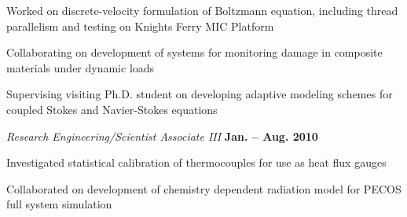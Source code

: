 \documentclass[12pt]{article}
\newenvironment{outerlist}[1][\enskip\textbullet]%
        {\begin{enumerate}[#1]}{\end{enumerate}%
         \vspace{-.6\baselineskip}}
\newenvironment{innerlist}[1][\enskip\textbullet]%
        {\begin{compactenum}[#1]}{\end{compactenum}}
\newcommand{\blankline}{\quad\pagebreak[2]}
\begin{document}
\begin{outerlist}
\begin{innerlist}
\item Worked on discrete-velocity formulation of Boltzmann equation, including thread parallelism and testing
on Knights Ferry MIC Platform
%
%
\item Collaborating on development of systems for monitoring damage in composite materials under dynamic loads
%
\item Supervising visiting Ph.D. student on developing adaptive modeling schemes for coupled Stokes and Navier-Stokes
equations
%
\end{innerlist}
\end{outerlist}

\blankline

\begin{outerlist}
\item[] \textit{Research Engineering/Scientist Associate III} \hfill \textbf{Jan. -- Aug. 2010}
\begin{innerlist}
\item Investigated statistical calibration of thermocouples for use as heat flux gauges
\item Collaborated on development of chemistry dependent radiation model for PECOS full system simulation
\end{innerlist}
\end{outerlist}

\blankline
\end{document}
